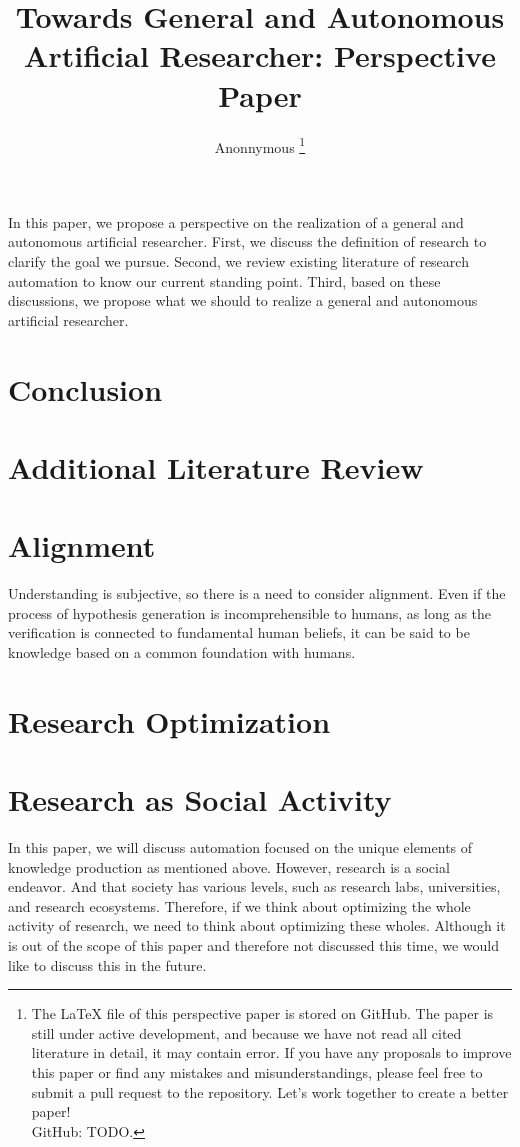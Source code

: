 \documentclass{book}
\title{Towards General and Autonomous Artificial Researcher: Perspective Paper}
\author{Anonnymous \footnote{The LaTeX file of this perspective paper is stored on GitHub. The paper is still under active development, and because we have not read all cited literature in detail, it may contain error. If you have any proposals to improve this paper or find any mistakes and misunderstandings, please feel free to submit a pull request to the repository. Let's work together to create a better paper! \\ GitHub: TODO. }}
\newenvironment{abstract}{}{}
\begin{document}
\sloppy
\maketitle
\tableofcontents

\begin{abstract}
    In this paper, we propose a perspective on the realization of a general and autonomous artificial researcher. First, we discuss the definition of research to clarify the goal we pursue. Second, we review existing literature of research automation to know our current standing point. Third, based on these discussions, we propose what we should to realize a general and autonomous artificial researcher.
\end{abstract}








\chapter{Conclusion}


% 



\appendix

\chapter{Additional Literature Review}

\chapter{Alignment}
Understanding is subjective, so there is a need to consider alignment. Even if the process of hypothesis generation is incomprehensible to humans, as long as the verification is connected to fundamental human beliefs, it can be said to be knowledge based on a common foundation with humans.

\chapter{Research Optimization}

\chapter{Research as Social Activity}
In this paper, we will discuss automation focused on the unique elements of knowledge production as mentioned above. However, research is a social endeavor. And that society has various levels, such as research labs, universities, and research ecosystems. Therefore, if we think about optimizing the whole activity of research, we need to think about optimizing these wholes. Although it is out of the scope of this paper and therefore not discussed this time, we would like to discuss this in the future.
\end{document}
